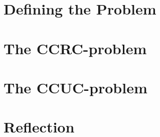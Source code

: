 

\part{Defining the Problem}


\part{The CCRC-problem}





\part{The CCUC-problem}

\part{Reflection}




